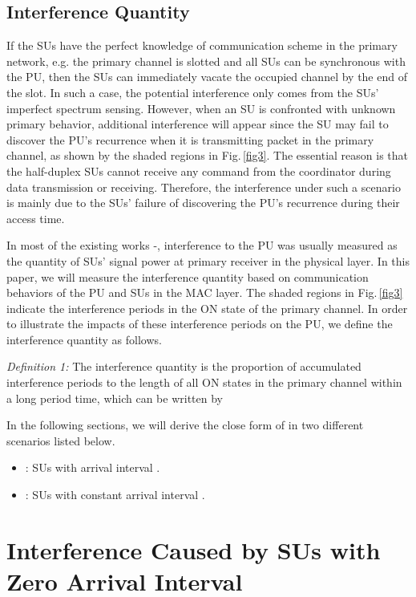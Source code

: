 \documentclass[11pt,draftcls]{IEEEtran}{\onecolumn}
\begin{document}
\subsection{Interference Quantity}\label{interference}

If the SUs have the perfect knowledge of communication scheme in the
primary network, e.g. the primary channel is slotted and all SUs can
be synchronous with the PU, then the SUs can immediately vacate the
occupied channel by the end of the slot. In such a case, the
potential interference only comes from the SUs' imperfect spectrum
sensing. However, when an SU is confronted with unknown primary
behavior, additional interference will appear since the SU may fail
to discover the PU's recurrence when it is transmitting packet in
the primary channel, as shown by the shaded regions in
Fig.\,\ref{fig3}. The essential reason is that the half-duplex SUs
cannot receive any command from the coordinator during data
transmission or receiving. Therefore, the interference under such a
scenario is mainly due to the SUs' failure of discovering the PU's
recurrence during their access time.

In most of the existing works \cite{0}-\cite{23}, interference to
the PU was usually measured as the quantity of SUs' signal power at
primary receiver in the physical layer. In this paper, we will
measure the interference quantity based on communication behaviors
of the PU and SUs in the MAC layer. The shaded regions in
Fig.\,\ref{fig3} indicate the interference periods in the ON state
of the primary channel. In order to illustrate the impacts of these
interference periods on the PU, we define the interference quantity
 as follows.

\emph{Definition 1:} The interference quantity  is the
proportion of accumulated interference periods to the length of all
ON states in the primary channel within a long period time, which
can be written by


In the following sections, we will derive the close form of 
in two different scenarios listed below.
\begin{itemize}
\item : SUs with arrival interval .
\item : SUs with constant arrival interval .
\end{itemize}


\section{Interference Caused by SUs with Zero Arrival
Interval}\label{lambdas0}
\end{document}

